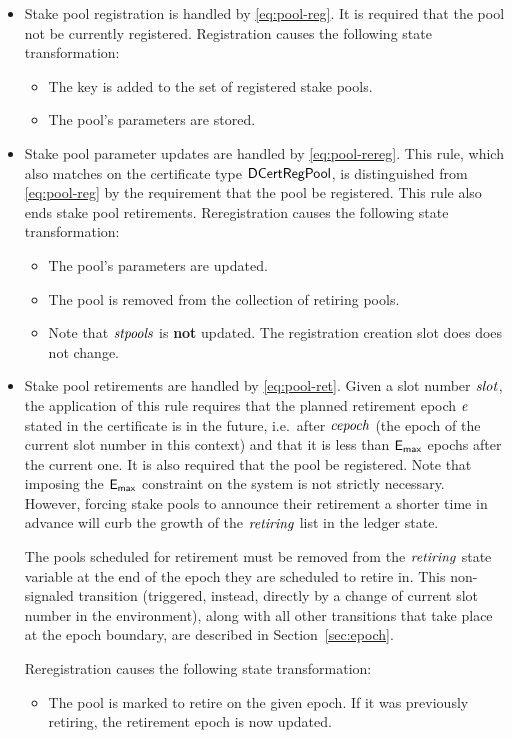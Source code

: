 \begin{itemize}
  \item Stake pool registration is handled by \cref{eq:pool-reg}.
    It is required that the pool not be currently registered.
    Registration causes the following state transformation:
    \begin{itemize}
      \item The key is added to the set of registered stake pools.
      \item The pool's parameters are stored.
    \end{itemize}
  \item Stake pool parameter updates are handled by \cref{eq:pool-rereg}.
    This rule, which also matches on the certificate type $\mathsf{DCertRegPool}$,
    is distinguished from \cref{eq:pool-reg} by the requirement that
    the pool be registered. This rule also ends stake pool retirements.
    Reregistration causes the following state transformation:
    \begin{itemize}
      \item The pool's parameters are updated.
      \item The pool is removed from the collection of retiring pools.
      \item Note that $\mathit{stpools}$ is \textbf{not} updated.
        The registration creation slot does does not change.
    \end{itemize}
  \item Stake pool retirements are handled by \cref{eq:pool-ret}.
    Given a slot number $\mathit{slot}$, the application of this rule requires that the
    planned retirement epoch $\mathit{e}$ stated in the certificate is in the future,
    i.e.~after $\mathit{cepoch}$ (the epoch of the current slot number in this context) and
    that it is less than $\mathsf{E_{max}}$ epochs after the current one.
    It is also required that the pool be registered.
    Note that imposing the $\mathsf{E_{max}}$ constraint on the system is not strictly necessary.
    However, forcing stake pools to announce their retirement a shorter time in
    advance will curb the growth of the $\mathit{retiring}$ list in the ledger state.

    The pools scheduled for retirement must be removed from
    the $\mathit{retiring}$ state variable at the end of the epoch they are scheduled
    to retire in. This non-signaled transition (triggered, instead, directly by a
    change of current slot number in the environment), along with all other transitions
    that take place at the epoch boundary, are described in Section~\ref{sec:epoch}.

    Reregistration causes the following state transformation:
    \begin{itemize}
      \item The pool is marked to retire on the given epoch.
        If it was previously retiring, the retirement epoch is now updated.
    \end{itemize}
\end{itemize}


